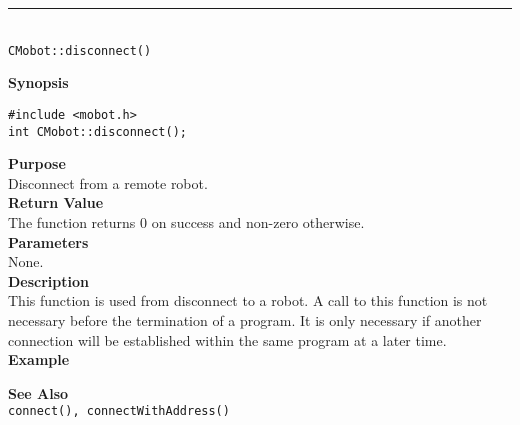 \noindent
\vspace{5pt}
\rule{4.5in}{0.015in}\\
\noindent
{\LARGE \texttt{CMobot::disconnect()}}\\
{}

\noindent
{\bf Synopsis}\\
\begin{verbatim}
#include <mobot.h>
int CMobot::disconnect();
\end{verbatim}

\noindent
{\bf Purpose}\\
Disconnect from a remote robot.\\

\noindent
{\bf Return Value}\\
The function returns 0 on success and non-zero otherwise.\\

\noindent
{\bf Parameters}\\
None.\\

\noindent
{\bf Description}\\
This function is used from disconnect to a robot. A call to this function is
not necessary before the termination of a program. It is only necessary if
another connection will be established within the same program at a later time.
\\

\noindent
{\bf Example}\\
\noindent

\noindent
{\bf See Also}\\
\texttt{connect(), connectWithAddress()}

